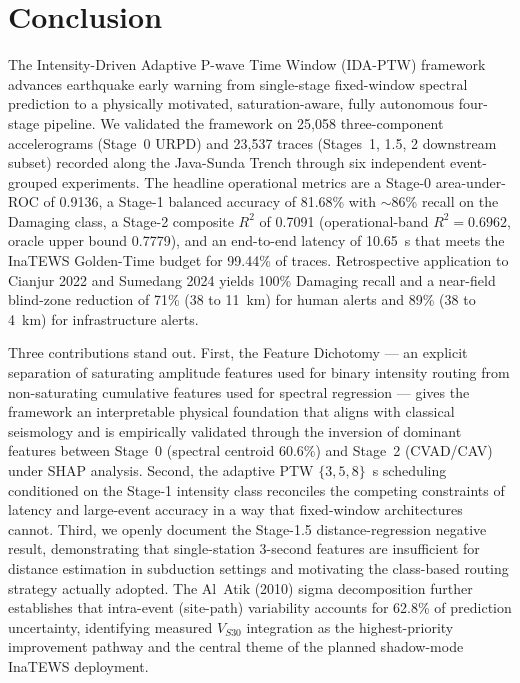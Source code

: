 \documentclass[10pt]{article}
\begin{document}
\section{Conclusion}

The Intensity-Driven Adaptive P-wave Time Window (IDA-PTW) framework advances earthquake early warning from single-stage fixed-window spectral prediction to a physically motivated, saturation-aware, fully autonomous four-stage pipeline. We validated the framework on 25{,}058 three-component accelerograms (Stage~0 URPD) and 23{,}537 traces (Stages~1, 1.5, 2 downstream subset) recorded along the Java-Sunda Trench through six independent event-grouped experiments. The headline operational metrics are a Stage-0 area-under-ROC of 0.9136, a Stage-1 balanced accuracy of 81.68\% with $\sim$86\% recall on the Damaging class, a Stage-2 composite $R^2$ of 0.7091 (operational-band $R^2 = 0.6962$, oracle upper bound 0.7779), and an end-to-end latency of 10.65~s that meets the InaTEWS Golden-Time budget for 99.44\% of traces. Retrospective application to Cianjur 2022 and Sumedang 2024 yields 100\% Damaging recall and a near-field blind-zone reduction of 71\% (38 to 11~km) for human alerts and 89\% (38 to 4~km) for infrastructure alerts.

Three contributions stand out. First, the Feature Dichotomy --- an explicit separation of saturating amplitude features used for binary intensity routing from non-saturating cumulative features used for spectral regression --- gives the framework an interpretable physical foundation that aligns with classical seismology and is empirically validated through the inversion of dominant features between Stage~0 (spectral centroid 60.6\%) and Stage~2 (CVAD/CAV) under SHAP analysis. Second, the adaptive PTW $\{3, 5, 8\}$~s scheduling conditioned on the Stage-1 intensity class reconciles the competing constraints of latency and large-event accuracy in a way that fixed-window architectures cannot. Third, we openly document the Stage-1.5 distance-regression negative result, demonstrating that single-station 3-second features are insufficient for distance estimation in subduction settings and motivating the class-based routing strategy actually adopted. The Al~Atik (2010) sigma decomposition further establishes that intra-event (site-path) variability accounts for 62.8\% of prediction uncertainty, identifying measured $V_{S30}$ integration as the highest-priority improvement pathway and the central theme of the planned shadow-mode InaTEWS deployment.
\end{document}
